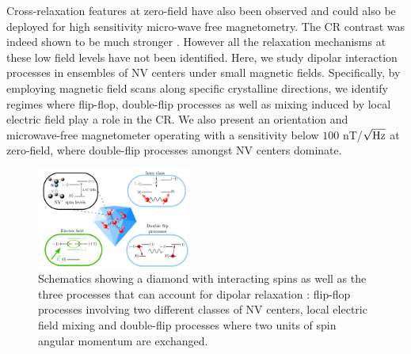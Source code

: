 \documentclass[preprintnumbers,amsmath,amssymb,superscriptaddress,twocolumn,showpacs]{revtex4-2}
\begin{document}

Cross-relaxation features at zero-field have also been observed and could also be deployed for high sensitivity micro-wave free magnetometry.
The CR contrast was indeed shown to be much stronger \citep{jarmola_longitudinal_2015,  mrozek_longitudinal_2015}. However all the relaxation mechanisms at these low field levels have not been identified. 
Here, we study dipolar interaction processes in ensembles of NV centers under small magnetic fields. Specifically, by employing magnetic field scans along specific crystalline directions, we identify regimes where flip-flop, double-flip processes as well as mixing induced by local electric field play a role in the CR. We also present an orientation and microwave-free magnetometer operating with a sensitivity below $100$ nT/$\sqrt{\rm Hz}$ at zero-field, where double-flip processes amongst NV centers dominate.

\begin{figure}
\includegraphics[width=0.45\textwidth]{Figures/shema_summary.pdf}
\caption{Schematics showing a diamond with interacting spins as well as the three processes that can account for dipolar relaxation : flip-flop processes involving two different classes of NV centers, local electric field mixing and double-flip processes where two units of spin angular momentum are exchanged. }
\label{schema_intro}
\end{figure}
\end{document}
